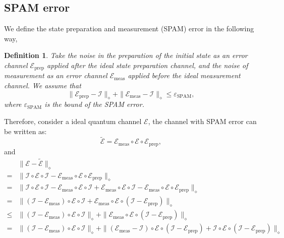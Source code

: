 \documentclass[twocolumn,superscriptaddress,aps,showpacs,amsmath,amstex,amssymb,citeautoscript,floatfix,pra,preprintnumbers]{revtex4-2}
\theoremstyle{plain}
\theoremstyle{plain}
\theoremstyle{plain}
\theoremstyle{plain}
\theoremstyle{plain}
\theoremstyle{plain}
\newtheorem{defn}{Definition}
\begin{document}
\begin{appendix}
 
\subsection{SPAM error}
\label{sec:SPAM_error}
We define the state preparation and measurement (SPAM) error in the following way,
\begin{defn}
    \label{defn:SPAM_err}
    Take the noise in the preparation of the initial state as an error channel $\mathcal{E}_{\mathrm{prep}}$ applied after the ideal state preparation channel, and the noise of measurement as an error channel $\mathcal{E}_{\mathrm{meas}}$  applied before the ideal measurement channel.
    We assume that
    \[
    \|\mathcal{E}_{\mathrm{prep}}-\mathcal{I}\|_{\diamond}+\|\mathcal{E}_{\mathrm{meas}}-\mathcal{I}\|_{\diamond}\leq \varepsilon_{\mathrm{SPAM}},
    \]
    where $\varepsilon_{\mathrm{SPAM}}$ is the bound of the SPAM error.
\end{defn}
Therefore, consider a ideal quantum channel $\mathcal{E}$, the channel with SPAM error can be written as:
\begin{equation}
    \widetilde{\mathcal{E}}= \mathcal{E}_{\mathrm{meas}}\circ \mathcal{E}\circ\mathcal{E}_{\text{prep}},
\end{equation}
and 
\begin{equation}
\begin{split}
    &\|\mathcal{E} - \widetilde{\mathcal{E}}\|_{\diamond}\\
    = & \|\mathcal{I}\circ\mathcal{E}\circ\mathcal{I} - \mathcal{E}_{\text{meas}}\circ\mathcal{E}\circ\mathcal{E}_{\text{prep}}\|_{\diamond}\\
    = & \|\mathcal{I}\circ\mathcal{E}\circ\mathcal{I} - \mathcal{E}_{\text{meas}}\circ\mathcal{E}\circ\mathcal{I} + \mathcal{E}_{\text{meas}}\circ\mathcal{E}\circ\mathcal{I}- \mathcal{E}_{\text{meas}}\circ\mathcal{E}\circ\mathcal{E}_{\text{prep}}\|_{\diamond}\\
    = & \|\left(\mathcal{I}-\mathcal{E}_{\text{meas}}\right)\circ\mathcal{E}\circ\mathcal{I} + \mathcal{E}_{\text{meas}}\circ\mathcal{E}\circ\left(\mathcal{I}-\mathcal{E}_{\text{prep}}\right)\|_{\diamond}\\
    \leq & \|\left(\mathcal{I}-\mathcal{E}_{\text{meas}}\right)\circ\mathcal{E}\circ\mathcal{I}\|_{\diamond} + \|\mathcal{E}_{\text{meas}}\circ\mathcal{E}\circ\left(\mathcal{I}-\mathcal{E}_{\text{prep}}\right)\|_{\diamond}\\
    = & \|\left(\mathcal{I}-\mathcal{E}_{\text{meas}}\right)\circ\mathcal{E}\circ\mathcal{I}\|_{\diamond} + \|\left(\mathcal{E}_{\text{meas}}-\mathcal{I}\right)\circ\mathcal{E}\circ\left(\mathcal{I}-\mathcal{E}_{\text{prep}}\right) + \mathcal{I}\circ\mathcal{E}\circ\left(\mathcal{I}-\mathcal{E}_{\text{prep}}\right)\|_{\diamond}\\

\end{split}
\end{equation}
\end{appendix}
\end{document}
